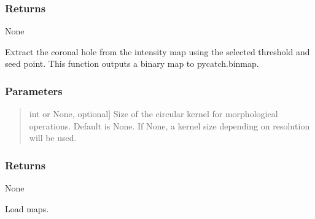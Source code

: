 \documentclass[letterpaper,10pt,english]{sphinxmanual}
\begin{document}
\begin{fulllineitems}
\begin{fulllineitems}
\begin{quote}
\begin{description}
\end{description}
\end{quote}


\subsubsection{Returns}
\label{\detokenize{pycatch/pycatch:id16}}
\sphinxAtStartPar
None

\end{fulllineitems}


\begin{fulllineitems}
\label{\detokenize{pycatch/pycatch:pycatch.pycatch.pycatch.extract_ch}}
\pysigstartsignatures
{}
\pysigstopsignatures
\sphinxAtStartPar
Extract the coronal hole from the intensity map using the selected threshold and seed point.
This function outputs a binary map to pycatch.binmap.


\subsubsection{Parameters}
\label{\detokenize{pycatch/pycatch:id17}}\begin{quote}
\begin{description}
\sphinxlineitem{kernel}{[}int or None, optional{]}
\sphinxAtStartPar
Size of the circular kernel for morphological operations. Default is None. If None, a kernel size depending on resolution will be used.

\end{description}
\end{quote}


\subsubsection{Returns}
\label{\detokenize{pycatch/pycatch:id18}}
\sphinxAtStartPar
None

\end{fulllineitems}


\begin{fulllineitems}
\label{\detokenize{pycatch/pycatch:pycatch.pycatch.pycatch.load}}
\pysigstartsignatures
{}
\pysigstopsignatures
\sphinxAtStartPar
Load maps.



\end{fulllineitems}
\end{fulllineitems}
\end{document}
